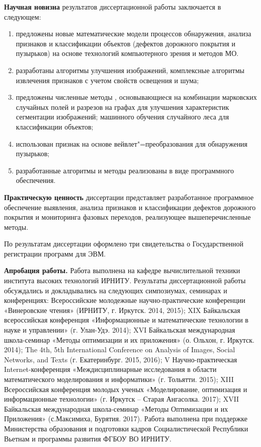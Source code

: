 \textbf{Научная новизна} результатов диссертационной работы заключается в следующем:
\begin{enumerate}
\item предложены новые математические модели процессов обнаружения, анализа признаков и классификации объектов (дефектов дорожного покрытия и пузырьков) на основе технологий компьютерного зрения и методов МО.

\item разработаны алгоритмы улучшения изображений, комплексные алгоритмы извлечения признаков с учетом свойств освещения и шума;

\item предложены численные методы , основывающиеся на комбинации марковских случайных полей и разрезов на графах для улучшения  характеристик сегментации изображений; машинного обучения случайного леса для классификации объектов;

\item использован признак на основе вейвлет"=преобразования для обнаружения пузырьков;

\item разработанные алгоритмы и методы реализованы в виде программного обеспечения.
\end{enumerate}

\textbf{Практическую ценность} диссертации представляет разработанное программное обеспечение выявления, анализа признаков и классификации дефектов дорожного покрытия и мониторинга фазовых переходов, реализующее вышеперечисленные методы.

 По результатам диссертации оформлено три свидетельства о Государственной регистрации программ для ЭВМ.

\textbf{Апробация работы.} Работа выполнена на кафедре вычислительной техники института высоких технологий ИРНИТУ. Результаты диссертационной работы обсуждались и докладывались на следующих симпозиумах, семинарах и конференциях: Всероссийские молодежные научно-практические конференции «Винеровские чтения» (ИРНИТУ, г. Иркутск. 2014, 2015); XIX Байкальская всероссийская конференция «Информационные и математические технологии в науке и управлении» (г. Улан-Удэ. 2014); XVI Байкальская международная школа-семинар «Методы оптимизации и их приложения» (о. Ольхон, г. Иркутск. 2014); The 4th, 5th International Conference on Analysis of Images, Social Networks, and Texts (г. Екатеринбург. 2015, 2016); V Научно-практическая Internet-конференция «Междисциплинарные исследования в области математического моделирования и информатики» (г. Тольятти. 2015); XIII Всероссийская конференция молодых ученых «Моделирование, оптимизация и информационные технологии» (г. Иркутск – Старая Ангасолка. 2017); XVII Байкальская международная школа-семинар «Методы Оптимизации и их Приложения» (с.Максимиха, Бурятия. 2017). Работа выполнена при поддержке Министерства образования и подготовки кадров Социалистической Республики Вьетнам и программы развития ФГБОУ ВО ИРНИТУ.


